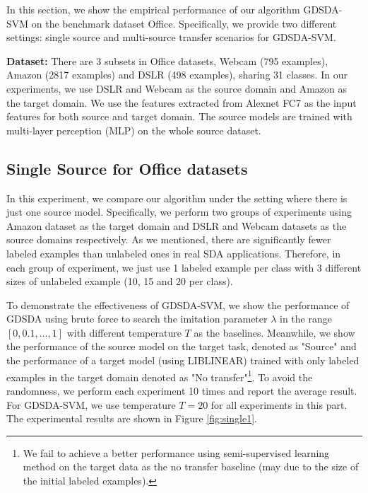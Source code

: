 In this section, we show the empirical performance of our algorithm GDSDA-SVM on the benchmark dataset Office. Specifically, we provide two different settings: single source and multi-source transfer scenarios for GDSDA-SVM.

\textbf{Dataset:}
There are 3 subsets in Office datasets, Webcam (795 examples), Amazon (2817 examples) and DSLR (498 examples), sharing 31 classes. In our experiments, we use DSLR and Webcam as the source domain and Amazon as the target domain.
We use the features extracted from Alexnet \cite{KrizhevskyNIPS12} FC7 as the input features for both source and target domain. The source models are trained with multi-layer perception (MLP) on the whole source dataset. 

\subsection{Single Source for Office datasets}
In this experiment, we compare our algorithm under the setting where there is just one source model. Specifically, we perform two groups of experiments using Amazon dataset as the target domain and DSLR and Webcam datasets as the source domains respectively. As we mentioned, there are significantly fewer labeled examples than unlabeled ones in real SDA applications.
Therefore, in each group of experiment, we just use 1 labeled example per class with 3 different sizes of unlabeled example (10, 15 and 20 per class).

To demonstrate the effectiveness of GDSDA-SVM, we show the performance of GDSDA using brute force to search the imitation parameter $\lambda$ in the range $[0,0.1,...,1]$ with different temperature $T$ as the baselines. Meanwhile, we show the performance of the source model on the target task, denoted as "Source" and the performance of a target model (using LIBLINEAR\cite{fan2008liblinear}) trained with only labeled examples in the target domain denoted as "No transfer"\footnote{We fail to achieve a better performance using semi-supervised learning method \cite{delalleau2005efficient} on the target data as the no transfer baseline (may due to the size of the initial labeled examples).}. To avoid the randomness, we perform each experiment 10 times and report the average result. For GDSDA-SVM, we use temperature $T=20$ for all experiments in this part. The experimental results are shown in Figure \ref{fig:single1}. 

